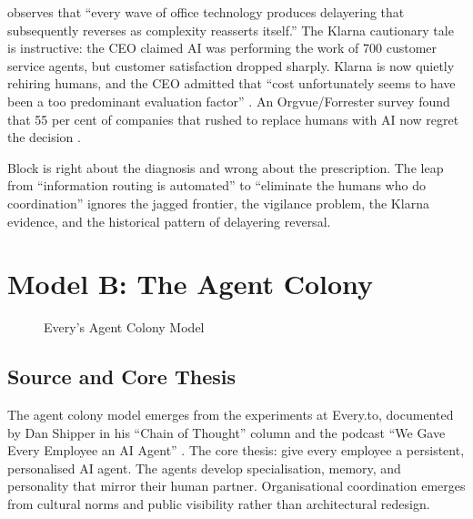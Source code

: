 \textcite{Spicer2026} observes that ``every wave of office technology produces delayering that subsequently reverses as complexity reasserts itself.'' The Klarna cautionary tale is instructive: the CEO claimed AI was performing the work of 700 customer service agents, but customer satisfaction dropped sharply. Klarna is now quietly rehiring humans, and the CEO admitted that ``cost unfortunately seems to have been a too predominant evaluation factor'' \parencite{Klarna2025}. An Orgvue/Forrester survey found that 55 per cent of companies that rushed to replace humans with AI now regret the decision \parencite{OrgvueForrester2025}.

\begin{cautionbox}
Block is right about the diagnosis and wrong about the prescription. The leap from ``information routing is automated'' to ``eliminate the humans who do coordination'' ignores the jagged frontier, the vigilance problem, the Klarna evidence, and the historical pattern of delayering reversal.
\end{cautionbox}

\section{Model B: The Agent Colony}

\begin{figure}[h]
\centering
{}
\caption{Every's Agent Colony Model}
\label{fig:agent-colony}
\end{figure}

\subsection{Source and Core Thesis}

The agent colony model emerges from the experiments at Every.to, documented by Dan Shipper in his ``Chain of Thought'' column and the podcast ``We Gave Every Employee an AI Agent'' \parencite{Shipper2026, Klaassen2025}. The core thesis: give every employee a persistent, personalised AI agent. The agents develop specialisation, memory, and personality that mirror their human partner. Organisational coordination emerges from cultural norms and public visibility rather than architectural redesign.

